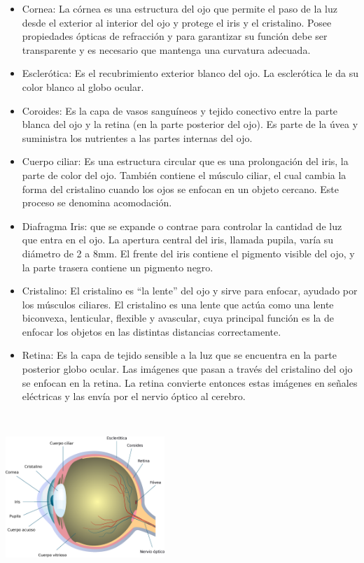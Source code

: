 \begin{itemize}
\item Cornea: La córnea es una estructura del ojo que permite el paso de la luz 
desde el exterior al interior del ojo y protege el iris y el cristalino. Posee 
propiedades ópticas de refracción y para garantizar su función debe ser transparente 
y es necesario que mantenga una curvatura adecuada.
\item Esclerótica: Es el recubrimiento exterior blanco del ojo. La esclerótica le da 
su color blanco al globo ocular.
\item Coroides: Es la capa de vasos sanguíneos y tejido conectivo entre la parte blanca del ojo y la retina (en la parte posterior del ojo). Es parte de la úvea y suministra los nutrientes a las partes internas del ojo.
\item Cuerpo ciliar: Es una estructura circular que es una prolongación del iris, la 
parte de color del ojo. También contiene el músculo ciliar, el cual cambia la forma 
del cristalino cuando los ojos se enfocan en un objeto cercano. Este proceso se 
denomina acomodación.
\item Diafragma Iris: que se expande o contrae para controlar la cantidad de luz que 
entra en el ojo. La apertura central del iris, llamada pupila, varía su diámetro de 2 
a 8mm. El frente del iris contiene el pigmento visible del ojo, y la parte trasera 
contiene un pigmento negro.
\item Cristalino: El cristalino es “la lente” del ojo y sirve para enfocar, ayudado 
por los músculos ciliares. El cristalino es una lente que actúa como una lente 
biconvexa, lenticular, flexible y avascular, cuya principal función es la de enfocar 
los objetos en las distintas distancias correctamente.
\item Retina: Es la capa de tejido sensible a la luz que se encuentra en la parte 
posterior globo ocular. Las imágenes que pasan a través del cristalino del ojo se 
enfocan en la retina. La retina convierte entonces estas imágenes en señales eléctricas
y las envía por el nervio óptico al cerebro.
\end{itemize}
~\cite{joseramon2005}
\begin{center}
    \includegraphics[width=0.45\textwidth]{Capitulo2/Fig1_2.eps}       
    \label{Fig1_2}
\end{center}
